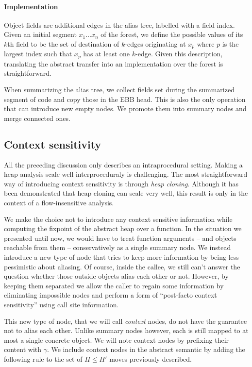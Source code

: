 \documentclass[11pt]{article}
\begin{document}
\paragraph{Implementation} Object fields are additional edges in the alias tree, labelled with a field index.
Given an initial segment $x_1\dots x_n$ of the forest, we define the possible values of its $k$th field to be the set of destination of $k$-edges originating at $x_p$ where $p$ is the largest index such that $x_p$ has at least one $k$-edge.
Given this description, translating the abstract transfer into an implementation over the forest is straightforward.

When summarizing the alias tree, we collect fields set during the summarized segment of code and copy those in the EBB head.
This is also the only operation that can introduce new empty nodes. We promote them into summary nodes and merge connected ones.

\subsection*{Context sensitivity}

All the preceding discussion only describes an intraprocedural setting.
Making a heap analysis scale well interproceduraly is challenging.
The most straightforward way of introducing context sensitivity is through \emph{heap cloning}.
Although it has been demonstrated that heap cloning can scale very well\cite{heapclone}, this result is only in the context of a flow-insensitive analysis.

We make the choice not to introduce any context sensitive information while computing the fixpoint of the abstract heap over a function.
In the situation we presented until now, we would have to treat function arguments -- and objects reachable from them -- conservatively as a single summary node.
We instead introduce a new type of node that tries to keep more information by being less pessimistic about aliasing.
Of course, inside the callee, we still can't answer the question whether those outside objects alias each other or not.
However, by keeping them separated we allow the caller to regain some information by eliminating impossible nodes and perform a form of ``post-facto context sensitivity'' using call site information.

This new type of node, that we will call \emph{context} nodes, do not have the guarantee not to alias each other.
Unlike summary nodes however, each is still mapped to at most a single concrete object.
We will note context nodes by prefixing their content with $\gamma$.
We include context nodes in the abstract semantic by adding the following rule to the set of $H\leq H'$ moves previously described.
\end{document}
